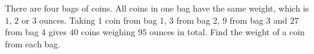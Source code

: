 There are four bags of coins. All coins in one bag have the same weight, which is $1$, $2$ or $3$ ounces. Taking $1$ coin from bag 1, $3$ from bag 2, $9$ from bag 3 and $27$ from bag 4 gives $40$ coins weighing $95$ ounces in total. Find the weight of a coin from each bag.
